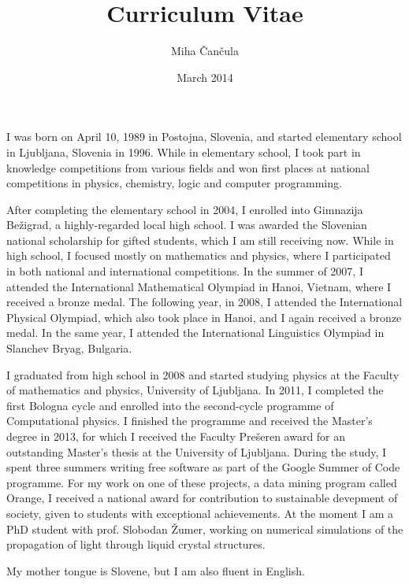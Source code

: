 \documentclass[a4paper]{article}
\title{Curriculum Vitae}
\author{Miha \v Can\v cula}
\date{March 2014}
\begin{document}
\maketitle

I was born on April 10, 1989 in Postojna, Slovenia, and started elementary school in Ljubljana, Slovenia in 1996. While in elementary school, I took part in knowledge competitions from various fields and won first places at national competitions in physics, chemistry, logic and computer programming. 

After completing the elementary school in 2004, I enrolled into Gimnazija Be\v zigrad, a highly-regarded local high school. I was awarded the Slovenian national scholarship for gifted students, which I am still receiving now. While in high school, I focused mostly on mathematics and physics, where I participated in both national and international competitions. In the summer of 2007, I attended the International Mathematical Olympiad in Hanoi, Vietnam, where I received a bronze medal. The following year, in 2008, I attended the International Physical Olympiad, which also took place in Hanoi, and I again received a bronze medal. In the same year, I attended the International Linguistics Olympiad in Slanchev Bryag, Bulgaria. 

I graduated from high school in 2008 and started studying physics at the Faculty of mathematics and physics, University of Ljubljana. In 2011, I completed the first Bologna cycle and enrolled into the second-cycle programme of Computational physics. I finished the programme and received the Master's degree in 2013, for which I received the Faculty Pre\v seren award for an outstanding Master's thesis at the University of Ljubljana. During the study, I spent three summers writing free software as part of the Google Summer of Code programme. For my work on one of these projects, a data mining program called Orange, I received a national award for contribution to sustainable devepment of society, given to students with exceptional achievements. At the moment I am a PhD student with prof. Slobodan Žumer, working on numerical simulations of the propagation of light through liquid crystal structures.

My mother tongue is Slovene, but I am also fluent in English. 
\end{document}
